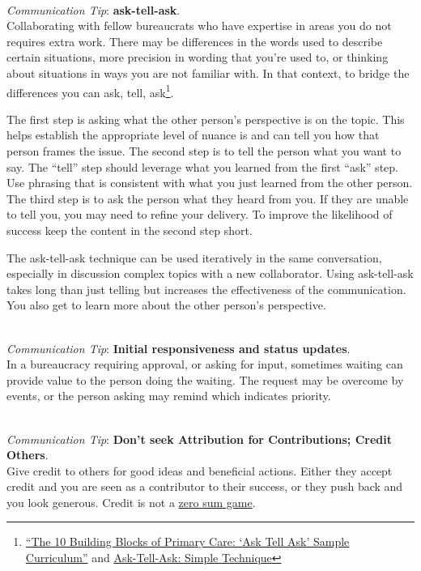 \ \\
\textit{Communication Tip}: \textbf{ask-tell-ask}.\\
Collaborating with fellow bureaucrats who have expertise in areas you do not requires extra work. There may be differences in the words used to describe certain situations, more precision in wording that you're used to, or thinking about situations in ways you are not familiar with. In that context, to bridge the differences you can ask, tell, ask\footnote{\href{https://cepc.ucsf.edu/sites/cepc.ucsf.edu/files/Curriculum_sample_14-0602.pdf}{``The 10 Building Blocks of Primary Care: `Ask Tell Ask' Sample Curriculum''} and \href{https://www.the-hospitalist.org/hospitalist/article/125126/qi-initiatives/ask-tell-ask-simple-technique-can-help-hospitalists}{Ask-Tell-Ask: Simple Technique}}. 

The first step is asking what the other person's perspective is on the topic. This helps establish the appropriate level of nuance is and can tell you how that person frames the issue. The second step is to tell the person what you want to say. The ``tell'' step should leverage what you learned from the first ``ask'' step. Use phrasing that is consistent with what you just learned from the other person. The third step is to ask the person what they heard from you. If they are unable to tell you, you may need to refine your delivery. To improve the likelihood of success keep the content in the second step short. 

The ask-tell-ask technique can be used iteratively in the same conversation, especially in discussion complex topics with a new collaborator. 
Using ask-tell-ask takes long than just telling but increases the effectiveness of the communication. You also get to learn more about the other person's perspective. 

\ \\
\textit{Communication Tip}: \textbf{Initial responsiveness and status updates}.\\
In a bureaucracy requiring approval, or asking for input, sometimes waiting can provide value to the person doing the waiting. The request may be overcome by events, or the person asking may remind which indicates priority.

\ \\
\textit{Communication Tip}: \textbf{Don't seek Attribution for Contributions; Credit Others\label{sec:credit-others}}.\\
Give credit to others for good ideas and beneficial actions. Either they accept credit and you are seen as a contributor to their success, or they push back and you look generous. Credit is not a \href{https://en.wikipedia.org/wiki/Zero-sum_game}{zero sum game}.

